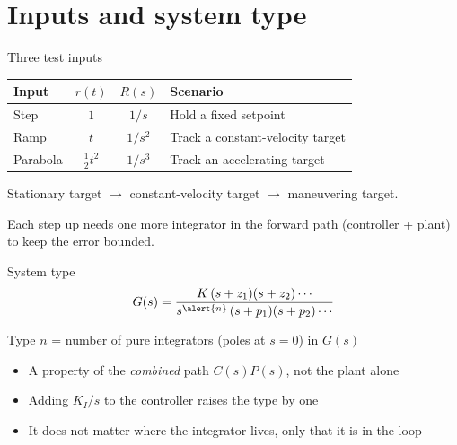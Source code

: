 \documentclass[aspectratio=169,12pt]{beamer}
\begin{document}
\section{Inputs and system type}

\begin{frame}{Three test inputs}
  \begin{center}
  \renewcommand{\arraystretch}{1.3}
  \begin{tabular}{lccl}
    \toprule
    Input    & $r(t)$         & $R(s)$  & Scenario \\
    \midrule
    Step     & $1$            & $1/s$   & Hold a fixed setpoint \\
    Ramp     & $t$            & $1/s^2$ & Track a constant-velocity target \\
    Parabola & $\tfrac12 t^2$ & $1/s^3$ & Track an accelerating target \\
    \bottomrule
  \end{tabular}
  \end{center}

  \bigskip
  Stationary target $\rightarrow$ constant-velocity target $\rightarrow$ maneuvering target.

  Each step up needs \alert{one more integrator} in the forward path (controller + plant) to keep the error bounded.
\end{frame}

\begin{frame}{System type}
  \[
    G(s) = \frac{K\,(s+z_1)(s+z_2)\cdots}{s^{\alert{n}}\,(s+p_1)(s+p_2)\cdots}
  \]

  \begin{center}
  Type $n$ = number of pure integrators (poles at $s = 0$) in $G(s)$
  \end{center}

  \bigskip
  \begin{itemize}
    \item A property of the \emph{combined} path $C(s)P(s)$, not the plant alone
    \item Adding $K_I/s$ to the controller raises the type by one
    \item It does not matter where the integrator lives, only that it is in the loop
  \end{itemize}
\end{frame}

\end{document}
